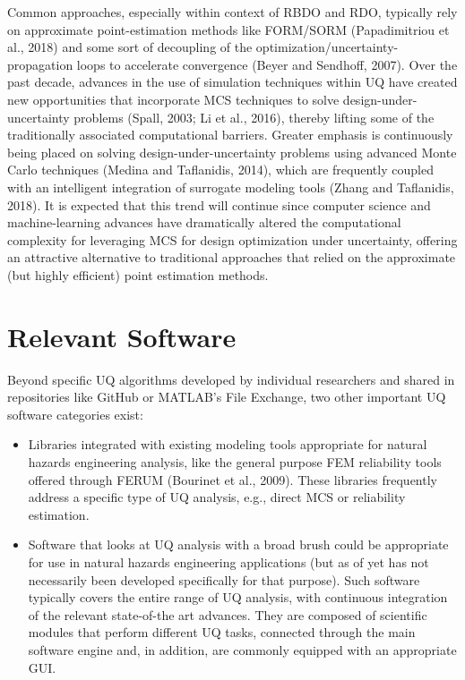 Common approaches, especially within context of RBDO and RDO, typically rely on approximate point-estimation methods like FORM/SORM (Papadimitriou et al., 2018) and some sort of decoupling of the optimization/uncertainty-propagation loops to accelerate convergence (Beyer and Sendhoff, 2007). Over the past decade, advances in the use of simulation techniques within UQ have created new opportunities that incorporate MCS techniques to solve design-under-uncertainty problems (Spall, 2003; Li et al., 2016), thereby lifting some of the traditionally associated computational barriers. Greater emphasis is continuously being placed on solving design-under-uncertainty problems using advanced Monte Carlo techniques (Medina and Taflanidis, 2014), which are frequently coupled with an intelligent integration of surrogate modeling tools (Zhang and Taflanidis, 2018). It is expected that this trend will continue since computer science and machine-learning advances have dramatically altered the computational complexity for leveraging MCS for design optimization under uncertainty, offering an attractive alternative to traditional approaches that relied on the approximate (but highly efficient) point estimation methods. 

\section{Relevant Software}
\label{sec:uq_tools}

Beyond specific UQ algorithms developed by individual researchers and shared in repositories like GitHub or MATLAB’s File Exchange, two other important UQ software categories exist:

\begin{itemize}
    \item Libraries integrated with existing modeling tools appropriate for natural hazards engineering analysis, like the general purpose FEM reliability tools offered through FERUM (Bourinet et al., 2009). These libraries frequently address a specific type of UQ analysis, e.g., direct MCS or reliability estimation.
    \item Software that looks at UQ analysis with a broad brush could be appropriate for use in natural hazards engineering applications (but as of yet has not necessarily been developed specifically for that purpose). Such software typically covers the entire range of UQ analysis, with continuous integration of the relevant state-of-the art advances. They are composed of scientific modules that perform different UQ tasks, connected through the main software engine and, in addition, are commonly equipped with an appropriate GUI. 
\end{itemize}
	
